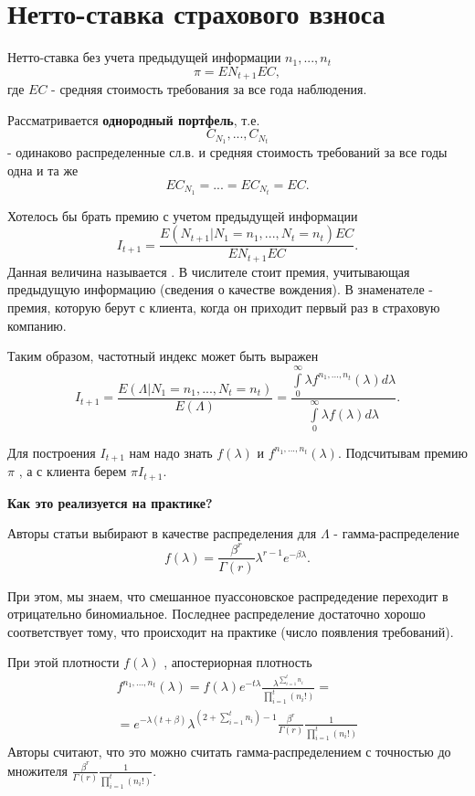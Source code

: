 \section{Нетто-ставка страхового взноса} %
Нетто-ставка без учета предыдущей информации $n_1,...,n_t$
\[ \pi = EN_{t+1}EC, \]
где $EC$ - средняя стоимость требования за все года наблюдения.

Рассматривается \textbf{однородный портфель}, т.е.
\[  C_{N_1},...,C_{N_t}\]
- одинаково распределенные сл.в. и средняя стоимость требований за все годы одна и та же
\[EC_{N_1}=...=EC_{N_t} = EC.\]

Хотелось бы брать премию с учетом предыдущей информации
\[ I_{t+1} = \frac{E(N_{t+1}|N_1=n_1,...,N_t=n_t)EC}{EN_{t+1}EC}. \]
Данная величина называется . В числителе стоит премия, учитывающая предыдущую информацию (сведения о качестве вождения). В знаменателе - премия, которую берут с клиента, когда он приходит первый раз в страховую компанию.

Таким образом, частотный индекс может быть выражен
\[I_{t+1} = \frac{E(\Lambda|N_1=n_1,...,N_t=n_t)}{E(\Lambda)} = \frac{\int\limits^{\infty}_{0}\lambda f^{n_1,...,n_t}(\lambda)d\lambda }{\int\limits^{\infty}_{0}\lambda f(\lambda)d\lambda}. \]

Для построения $I_{t+1}$ нам надо знать $f(\lambda)$ и $f^{n_1,...,n_t}(\lambda)$. Подсчитывам премию $\pi$ , а с клиента берем $\pi I_{t+1}$.

\textbf{Как это реализуется на практике?}

Авторы статьи выбирают в качестве распределения для $\Lambda$ - гамма-распределение
\[ f(\lambda) = \frac{\beta^r}{\Gamma(r)}\lambda^{r-1}e^{-\beta\lambda}. \]

При этом, мы знаем, что смешанное пуассоновское распредедение переходит в отрицательно биномиальное. Последнее распределение достаточно хорошо соответствует тому, что происходит на практике (число появления требований).

При этой плотности $f(\lambda)$ , апостериорная плотность 
\begin{gather*}
	f^{n_1,...,n_t}(\lambda) = f(\lambda)e^{-t\lambda}\frac{\lambda^{\sum\limits_{i=1}^{t}n_i}}{\prod\limits_{i=1}^{t}(n_i!)} =\\
	= e^{-\lambda(t+\beta)}\lambda^{(2 + \sum\limits_{i=1}^{t}n_i)-1}\frac{\beta^r}{\Gamma(r)}\frac{1}{\prod\limits_{i=1}^{t}(n_i!)}
\end{gather*}
Авторы считают, что это можно считать гамма-распределением с точностью до множителя $\frac{\beta^r}{\Gamma(r)}\frac{1}{\prod\limits_{i=1}^{t}(n_i!)}.$

